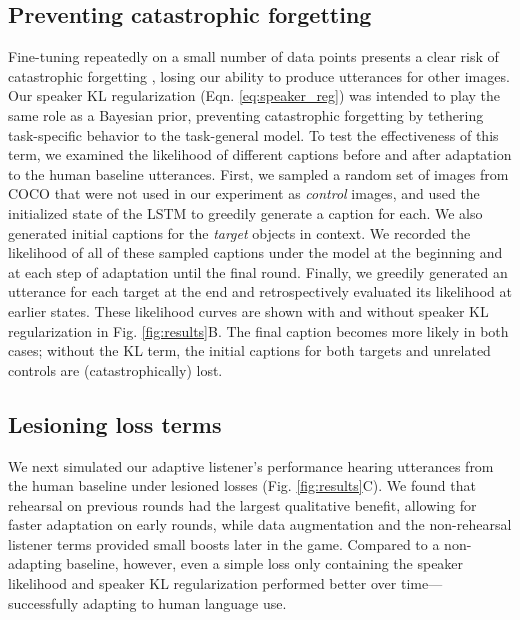 \subsection{Preventing catastrophic forgetting}
Fine-tuning repeatedly on a small number of data points presents a clear risk of catastrophic forgetting \cite{robins_catastrophic_1995}, losing our ability to produce utterances for other images. %
Our speaker KL regularization (Eqn. \ref{eq:speaker_reg}) was intended to play the same role as a Bayesian prior, preventing catastrophic forgetting by tethering task-specific behavior to the task-general model.
To test the effectiveness of this term, we examined the likelihood of different captions before and after adaptation to the human baseline utterances. 
First, we sampled a random set of images from COCO that were not used in our experiment as \emph{control} images, and used the initialized state of the LSTM to greedily generate a caption for each.
We also generated initial captions for the \emph{target} objects in context. %
We recorded the likelihood of all of these sampled captions under the model at the beginning and at each step of adaptation until the final round. 
Finally, we greedily generated an utterance for each target at the end and retrospectively evaluated its likelihood at earlier states.
These likelihood curves are shown with and without speaker KL regularization in Fig. \ref{fig:results}B.
The final caption becomes more likely in both cases; without the KL term, the initial captions for both targets and unrelated controls are (catastrophically) lost.
 
\subsection{Lesioning loss terms}

We next simulated our adaptive listener's performance hearing utterances from the human baseline under lesioned losses (Fig. \ref{fig:results}C). 
We found that rehearsal on previous rounds had the largest qualitative benefit, allowing for faster adaptation on early rounds, while data augmentation and the non-rehearsal listener terms provided small boosts later in the game.
Compared to a non-adapting baseline, however, even a simple loss only containing the speaker likelihood and speaker KL regularization performed better over time---successfully adapting to human language use.



